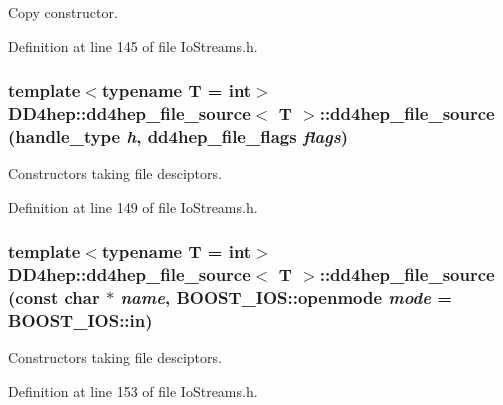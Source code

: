 Copy constructor. 

Definition at line 145 of file IoStreams.h.\hypertarget{class_d_d4hep_1_1dd4hep__file__source_a66badf1d47206c7d61e0e036e910999e}{
\subsubsection[{dd4hep\_\-file\_\-source}]{\setlength{\rightskip}{0pt plus 5cm}template$<$typename T = int$>$ {\bf DD4hep::dd4hep\_\-file\_\-source}$<$ {\bf T} $>$::{\bf dd4hep\_\-file\_\-source} ({\bf handle\_\-type} {\em h}, \/  {\bf dd4hep\_\-file\_\-flags} {\em flags})}}
\label{class_d_d4hep_1_1dd4hep__file__source_a66badf1d47206c7d61e0e036e910999e}


Constructors taking file desciptors. 

Definition at line 149 of file IoStreams.h.\hypertarget{class_d_d4hep_1_1dd4hep__file__source_a84e465929a469a23c8347adf98f68afe}{
\subsubsection[{dd4hep\_\-file\_\-source}]{\setlength{\rightskip}{0pt plus 5cm}template$<$typename T = int$>$ {\bf DD4hep::dd4hep\_\-file\_\-source}$<$ {\bf T} $>$::{\bf dd4hep\_\-file\_\-source} (const char $\ast$ {\em name}, \/  BOOST\_\-IOS::openmode {\em mode} = {\ttfamily BOOST\_\-IOS::in})}}
\label{class_d_d4hep_1_1dd4hep__file__source_a84e465929a469a23c8347adf98f68afe}


Constructors taking file desciptors. 

Definition at line 153 of file IoStreams.h.

